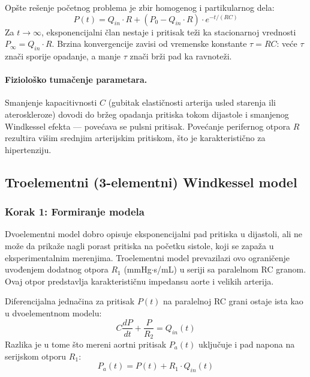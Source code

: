 \documentclass[12pt,a4paper]{article}
\begin{document}
Opšte rešenje početnog problema je zbir homogenog i partikularnog dela:
\begin{equation}
    P(t) = Q_{in}\cdot R + (P_0 - Q_{in}\cdot R)\cdot e^{-t/(RC)}
    \label{eq:opste}
\end{equation}
Za $t \to \infty$, eksponencijalni član nestaje i pritisak teži ka stacionarnoj vrednosti $P_\infty = Q_{in}\cdot R$. Brzina konvergencije zavisi od vremenske konstante $\tau = RC$: veće $\tau$ znači sporije opadanje, a manje $\tau$ znači brži pad ka ravnoteži.

\paragraph{Fiziološko tumačenje parametara.} Smanjenje kapacitivnosti $C$ (gubitak elastičnosti arterija usled starenja ili ateroskleroze) dovodi do bržeg opadanja pritiska tokom dijastole i smanjenog Windkessel efekta --- povećava se pulsni pritisak. Povećanje perifernog otpora $R$ rezultira višim srednjim arterijskim pritiskom, što je karakteristično za hipertenziju.

\subsection{Troelementni (3-elementni) Windkessel model}

\subsubsection{Korak 1: Formiranje modela}

Dvoelementni model dobro opisuje eksponencijalni pad pritiska u dijastoli, ali ne može da prikaže nagli porast pritiska na početku sistole, koji se zapaža u eksperimentalnim merenjima. Troelementni model prevazilazi ovo ograničenje uvođenjem dodatnog otpora $R_1$ (mmHg$\cdot$s/mL) u seriji sa paralelnom RC granom. Ovaj otpor predstavlja karakterističnu impedansu aorte i velikih arterija.

Diferencijalna jednačina za pritisak $P(t)$ na paralelnoj RC grani ostaje ista kao u dvoelementnom modelu:
\begin{equation}
    C\frac{dP}{dt} + \frac{P}{R_2} = Q_{in}(t)
    \label{eq:3elem}
\end{equation}
Razlika je u tome što mereni aortni pritisak $P_a(t)$ uključuje i pad napona na serijskom otporu $R_1$:
\begin{equation}
    P_a(t) = P(t) + R_1\cdot Q_{in}(t)
    \label{eq:aortni}
\end{equation}
\end{document}
